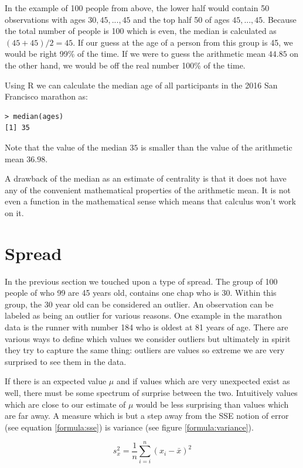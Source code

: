 \documentclass{tufte-book} %
\begin{document}
In the example of 100 people from above, the lower half would contain 50 observations with ages $30, 45, ..., 45$ and the top half 50 of ages $45,...,45$. Because the total number of people is 100 which is even, the median is calculated as $(45 + 45) / 2 = 45$. If our guess at the age of a person from this group is 45, we would be right 99\% of the time. If we were to guess the arithmetic mean $44.85$ on the other hand, we would be off the real number 100\% of the time.

Using R we can calculate the median age of all participants in the 2016 San Francisco marathon as:

\begin{Verbatim}
> median(ages)
[1] 35
\end{Verbatim}

Note that the value of the median $35$ is smaller than the value of the arithmetic mean $36.98$.

A drawback of the median as an estimate of centrality is that it does not have any of the convenient mathematical properties of the arithmetic mean. It is not even a function in the mathematical sense which means that calculus won't work on it. 

\section{Spread}

In the previous section we touched upon a type of spread. The group of 100 people of who 99 are 45 years old, contains one chap who is 30. Within this group, the 30 year old can be considered an outlier. An observation can be labeled as being an outlier for various reasons. One example in the marathon data is the runner with number 184 who is oldest at 81 years of age. There are various ways to define which values we consider outliers but ultimately in spirit they try to capture the same thing: outliers are values so extreme we are very surprised to see them in the data.

If there is an expected value $\mu$ and if values which are very unexpected exist as well, there must be some spectrum of surprise between the two. Intuitively values which are close to our estimate of $\mu$ would be less surprising than values which are far away. A measure which is but a step away from the SSE notion of error (see equation \ref{formula:sse}) is variance (see figure \ref{formula:variance}). 

\begin{equation} \label{formula:variance}
	s_x^2 = \frac{1}{n} \sum_{i=i}^{n} (x_i - \bar{x})^2
\end{equation}
\end{document}
